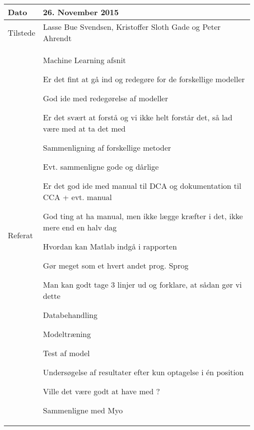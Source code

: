 \begin{center}
	\begin{tabular}{| l | p{10cm} |}
		\hline
		Dato		& 26. November 2015\\ \hline
		Tilstede 	& Lasse Bue Svendsen, Kristoffer Sloth Gade og Peter Ahrendt\\ \hline
		Referat		& \vspace{-5mm}\begin{myEnumerate}
			\item Machine Learning afsnit
			\begin{myItemize}				
				\item Er det fint at gå ind og redegøre for de forskellige modeller
				\begin{myItemize}
					\item God ide med redegørelse af modeller
					\item Er det svært at forstå og vi ikke helt forstår det, så lad være med at ta det med
					\item Sammenligning af forskellige metoder
				\end{myItemize}
				\item Evt. sammenligne gode og dårlige
			\end{myItemize}
			\item Er det god ide med manual til DCA og dokumentation til CCA + evt. manual
			\begin{myItemize}
				\item God ting at ha manual, men ikke lægge kræfter i det, ikke mere end en halv dag
			\end{myItemize}
			\item Hvordan kan Matlab indgå i rapporten
			\begin{myItemize}
				\item Gør meget som et hvert andet prog. Sprog
				\item Man kan godt tage 3 linjer ud og forklare, at sådan gør vi dette
				\item Databehandling
				\item Modeltræning
				\item Test af model
			\end{myItemize}
			\item Undersøgelse af resultater efter kun optagelse i én position
			\begin{myItemize}
				\item Ville det være godt at have med ?
				\item Sammenligne med Myo
			\end{myItemize}
		\end{myEnumerate}\\ 	
		\hline
	\end{tabular}
\end{center}

